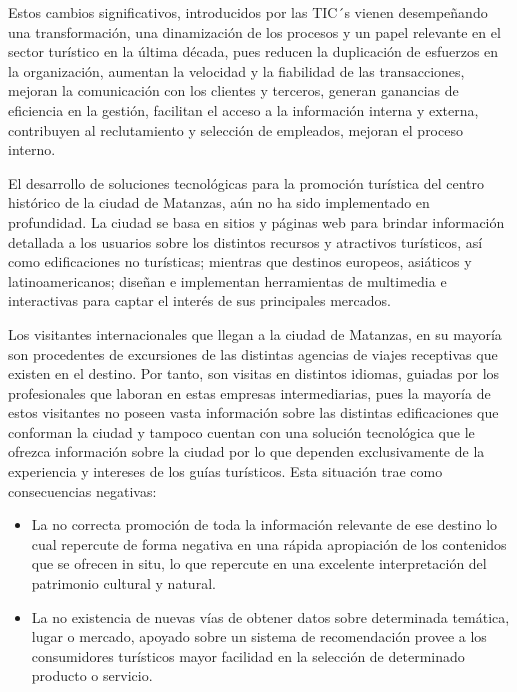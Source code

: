 Estos cambios significativos, introducidos por las TIC´s vienen desempeñando una transformación, una dinamización de los procesos y un papel relevante en el sector turístico en la última década, pues reducen la duplicación de esfuerzos en la organización, aumentan la velocidad y la fiabilidad de las transacciones, mejoran la comunicación con los clientes y terceros, generan ganancias de eficiencia en la gestión, facilitan el acceso a la información interna y externa, contribuyen al reclutamiento y selección de empleados, mejoran el proceso interno.

\vspace*{1.5em}


El desarrollo de soluciones tecnológicas para la promoción turística del centro histórico de la ciudad de Matanzas, aún no ha sido implementado en profundidad. La ciudad se basa en sitios y páginas web para brindar información detallada a los usuarios sobre los distintos recursos y atractivos turísticos, así como edificaciones no turísticas; mientras que destinos europeos, asiáticos y latinoamericanos; diseñan e implementan herramientas de multimedia e interactivas para captar el interés de sus principales mercados.

\vspace*{1.5em}

Los visitantes internacionales que llegan a la ciudad de Matanzas, en su mayoría son procedentes de excursiones de las distintas agencias de viajes receptivas que existen en el destino. Por tanto, son visitas en distintos idiomas, guiadas por los profesionales que laboran en estas empresas intermediarias, pues la mayoría de estos visitantes no poseen vasta información sobre las distintas edificaciones que conforman la ciudad y tampoco cuentan con una solución tecnológica que le ofrezca información sobre la ciudad por lo que dependen exclusivamente de la experiencia y intereses de los guías turísticos. Esta situación trae como consecuencias negativas:

\begin{itemize}
	\item La no correcta promoción de toda la información relevante de ese destino lo cual repercute de forma negativa en una rápida apropiación de los contenidos que se ofrecen in situ, lo que repercute en una excelente interpretación del patrimonio cultural y natural.
	\item La no existencia de nuevas vías de obtener datos sobre determinada temática, lugar o mercado, apoyado sobre un sistema de recomendación provee a los consumidores turísticos mayor facilidad en la selección de determinado producto o servicio.
	
\end{itemize}




